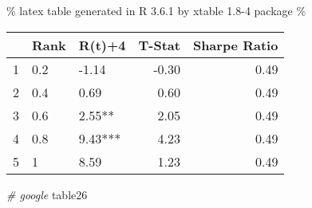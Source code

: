 \documentclass[
]{article}
\newenvironment{Shaded}{\begin{snugshade}}{\end{snugshade}}
\newcommand{\CommentTok}[1]{\textcolor[rgb]{0.56,0.35,0.01}{\textit{#1}}}
\newcommand{\NormalTok}[1]{#1}
\begin{document}
\% latex table generated in R 3.6.1 by xtable 1.8-4 package \%

\begin{tabular}{rllrr}
  \hline
 & Rank & R(t)+4 & T-Stat & Sharpe Ratio \\ 
  \hline
1 & 0.2 & -1.14 & -0.30 & 0.49 \\ 
  2 & 0.4 & 0.69 & 0.60 & 0.49 \\ 
  3 & 0.6 & 2.55** & 2.05 & 0.49 \\ 
  4 & 0.8 & 9.43*** & 4.23 & 0.49 \\ 
  5 & 1 & 8.59 & 1.23 & 0.49 \\ 
   \hline
\end{tabular}

\begin{Shaded}
\end{Shaded}

\begin{Shaded}
\begin{Highlighting}[]
\CommentTok{# google}
\NormalTok{table26}
\end{Highlighting}
\end{Shaded}
\end{document}
